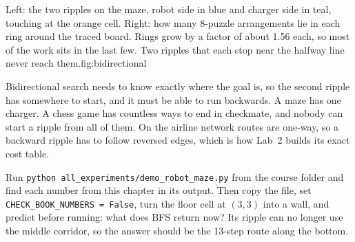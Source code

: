 \begin{utpfig}{Left: the two ripples on the maze, robot side in blue and charger side in teal, touching at the orange cell. Right: how many 8-puzzle arrangements lie in each ring around the traced board. Rings grow by a factor of about 1.56 each, so most of the work sits in the last few. Two ripples that each stop near the halfway line never reach them.}{fig:bidirectional}
\hspace{0.5cm}%
\end{utpfig}

\begin{pitfall}
Bidirectional search needs to know exactly where the goal is, so the second ripple has somewhere to start, and it must be able to run backwards. A maze has one charger. A chess game has countless ways to end in checkmate, and nobody can start a ripple from all of them. On the airline network routes are one-way, so a backward ripple has to follow reversed edges, which is how Lab~2 builds its exact cost table.
\end{pitfall}

\begin{tryit}
Run \texttt{python all\_experiments/demo\_robot\_maze.py} from the course folder and find each number from this chapter in its output. Then copy the file, set \texttt{CHECK\_BOOK\_NUMBERS = False}, turn the floor cell at $(3,3)$ into a wall, and predict before running: what does BFS return now? Its ripple can no longer use the middle corridor, so the answer should be the 13-step route along the bottom.
\end{tryit}

